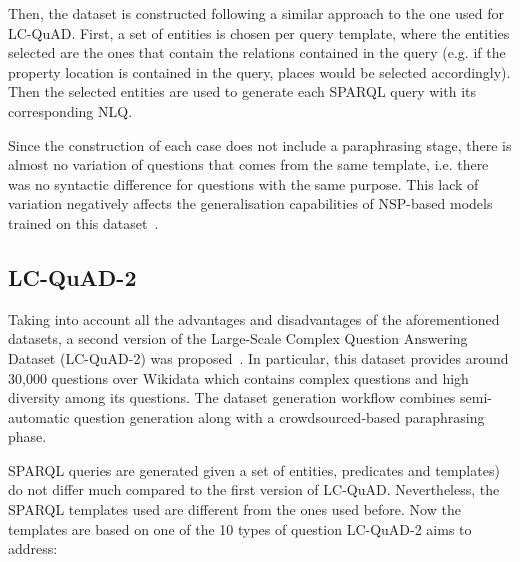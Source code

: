 Then, the dataset is constructed following a similar approach to the one used for LC-QuAD. 
First, a set of entities is chosen per query template, where the entities selected are the ones 
that contain the relations contained in the query (e.g. if the property location is contained 
in the query, places would be selected accordingly). Then the selected entities are used to 
generate each SPARQL query with its corresponding NLQ. 

Since the construction of each case does not include a paraphrasing stage, there is almost no 
variation of questions that comes from the same template, i.e. there was no syntactic 
difference for questions with the same purpose. This lack of variation negatively affects the 
generalisation capabilities of NSP-based models trained on this dataset~\cite{qa:BerantL14}.

\subsection{LC-QuAD-2}
Taking into account all the advantages and disadvantages of the aforementioned datasets, a 
second version of the Large-Scale Complex Question Answering Dataset (LC-QuAD-2) was 
proposed~\cite{dataset:lcquad2-DubeyBA019}. In particular, this dataset provides around 30,000 
questions over Wikidata which contains complex questions and high diversity among its questions. 
The dataset generation workflow combines semi-automatic question generation along with a 
crowdsourced-based paraphrasing phase.

SPARQL queries are generated given a set of entities, predicates and templates) do not differ 
much compared to the first version of LC-QuAD. Nevertheless, the SPARQL templates used are 
different from the ones used before. Now the templates are based on one of the 10 types of 
question LC-QuAD-2 aims to address:

